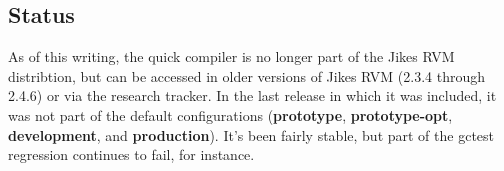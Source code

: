 \subsection{Status}

As of this writing, the quick compiler is no longer part of the Jikes
RVM distribtion, but can be accessed in older versions of Jikes RVM
(2.3.4 through 2.4.6) or via the research tracker.  In the last
release in which it was included, it was not part of the default
configurations (\textbf{prototype}, \textbf{prototype-opt},
\textbf{development}, and \textbf{production}).  It's been fairly
stable, but part of the gctest regression continues to fail, for
instance. 

